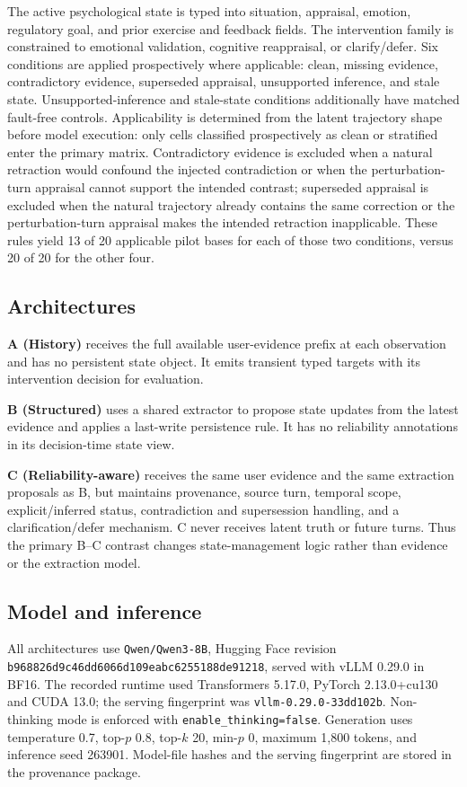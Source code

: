 \documentclass[10pt]{article}
\begin{document}
The active psychological state is typed into situation, appraisal, emotion, regulatory goal, and prior exercise and feedback fields. The intervention family is constrained to emotional validation, cognitive reappraisal, or clarify/defer. Six conditions are applied prospectively where applicable: clean, missing evidence, contradictory evidence, superseded appraisal, unsupported inference, and stale state. Unsupported-inference and stale-state conditions additionally have matched fault-free controls. Applicability is determined from the latent trajectory shape before model execution: only cells classified prospectively as clean or stratified enter the primary matrix. Contradictory evidence is excluded when a natural retraction would confound the injected contradiction or when the perturbation-turn appraisal cannot support the intended contrast; superseded appraisal is excluded when the natural trajectory already contains the same correction or the perturbation-turn appraisal makes the intended retraction inapplicable. These rules yield 13 of 20 applicable pilot bases for each of those two conditions, versus 20 of 20 for the other four.

\subsection{Architectures}
\textbf{A (History)} receives the full available user-evidence prefix at each observation and has no persistent state object. It emits transient typed targets with its intervention decision for evaluation.

\textbf{B (Structured)} uses a shared extractor to propose state updates from the latest evidence and applies a last-write persistence rule. It has no reliability annotations in its decision-time state view.

\textbf{C (Reliability-aware)} receives the same user evidence and the same extraction proposals as B, but maintains provenance, source turn, temporal scope, explicit/inferred status, contradiction and supersession handling, and a clarification/defer mechanism. C never receives latent truth or future turns. Thus the primary B--C contrast changes state-management logic rather than evidence or the extraction model.

\subsection{Model and inference}
All architectures use \texttt{Qwen/Qwen3-8B}, Hugging Face revision \texttt{b968826d9c46dd6066d109eabc6255188de91218}, served with vLLM 0.29.0 in BF16. The recorded runtime used Transformers 5.17.0, PyTorch 2.13.0+cu130 and CUDA 13.0; the serving fingerprint was \texttt{vllm-0.29.0-33dd102b}. Non-thinking mode is enforced with \texttt{enable\_thinking=false}. Generation uses temperature 0.7, top-$p$ 0.8, top-$k$ 20, min-$p$ 0, maximum 1,800 tokens, and inference seed 263901. Model-file hashes and the serving fingerprint are stored in the provenance package.
\end{document}
